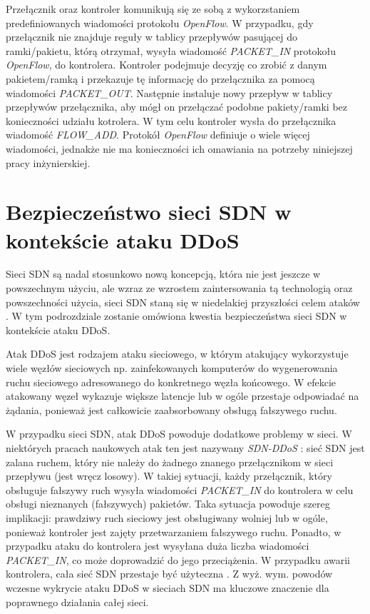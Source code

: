 Przełącznik oraz kontroler komunikują się ze sobą z wykorzstaniem
predefiniowanych wiadomości protokołu \textit{OpenFlow}. W przypadku, gdy
przełącznik nie znajduje reguły w tablicy przepływów pasującej do ramki/pakietu,
którą otrzymał, wysyła wiadomość \textit{PACKET\_IN} protokołu
\textit{OpenFlow}, do kontrolera. Kontroler podejmuje decyzję co zrobić z danym 
pakietem/ramką i przekazuje tę informację do przełącznika za pomocą wiadomości
\textit{PACKET\_OUT}. Następnie instaluje nowy przepływ w tablicy przepływów
przełącznika, aby mógł on przełączać podobne pakiety/ramki bez konieczności
udziału kotrolera. W tym celu kontroler wysła do przełącznika wiadomość
\textit{FLOW\_ADD}. Protokół \textit{OpenFlow} definiuje o wiele więcej
wiadomości, jednakże nie ma konieczności ich omawiania na potrzeby niniejszej
pracy inżynierskiej.

\section{Bezpieczeństwo sieci SDN w kontekście ataku DDoS}

Sieci SDN są nadal stosunkowo nową koncepcją, która nie jest jeszcze w
powszechnym użyciu, ale wzraz ze wzrostem zaintersowania tą technologią oraz
powszechności użycia, sieci SDN staną się w niedelakiej przyszłości celem ataków
\cite{sdnsecurityblog}. W tym podrozdziale zostanie omówiona kwestia
bezpieczeństwa sieci SDN w kontekście ataku DDoS.

Atak DDoS jest rodzajem ataku sieciowego, w którym atakujący wykorzystuje wiele
węzłów sieciowych np. zainfekowanych komputerów do wygenerowania ruchu
sieciowego adresowanego do konkretnego węzła końcowego. W efekcie atakowany
węzeł wykazuje większe latencje lub w ogóle przestaje odpowiadać na żądania,
ponieważ jest całkowicie zaabsorbowany obsługą fałszywego ruchu.

W przypadku sieci SDN, atak DDoS powoduje dodatkowe problemy w sieci. W
niektórych pracach naukowych atak ten jest nazywany \textit{SDN-DDoS}
\cite{ddosbronksarticle}: sieć SDN jest zalana ruchem, który nie należy do
żadnego znanego przełącznikom w sieci przepływu (jest wręcz losowy). W takiej
sytuacji, każdy przełącznik, który obsługuje fałszywy ruch wysyła wiadomości
\textit{PACKET\_IN} do kontrolera w celu obsługi nieznanych (fałszywych)
pakietów. Taka sytuacja powoduje szereg implikacji: prawdziwy ruch sieciowy jest
obsługiwany wolniej lub w ogóle, ponieważ kontroler jest zajęty przetwarzaniem
fałszywego ruchu. Ponadto, w przypadku ataku do kontrolera jest wysyłana duża
liczba wiadomości \textit{PACKET\_IN}, co może doprowadzić do jego
przeciążenia. W przypadku awarii kontrolera, cała sieć SDN przestaje być
użyteczna \cite{mainddosarticle}. Z wyż. wym. powodów wczesne wykrycie ataku
DDoS w sieciach SDN ma kluczowe znaczenie dla poprawnego działania całej sieci.

